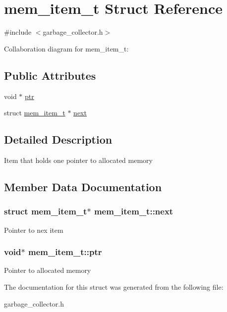 \hypertarget{structmem__item__t}{}\section{mem\+\_\+item\+\_\+t Struct Reference}
\label{structmem__item__t}


{\ttfamily \#include $<$garbage\+\_\+collector.\+h$>$}



Collaboration diagram for mem\+\_\+item\+\_\+t\+:
\subsection*{Public Attributes}
\begin{DoxyCompactItemize}
\item 
void $\ast$ \hyperlink{structmem__item__t_a772a66e71369367d17ad83f95cb05334}{ptr}
\item 
struct \hyperlink{structmem__item__t}{mem\+\_\+item\+\_\+t} $\ast$ \hyperlink{structmem__item__t_a0c2420432b5b23b9c9c18ff784ae2ae3}{next}
\end{DoxyCompactItemize}


\subsection{Detailed Description}
Item that holds one pointer to allocated memory 

\subsection{Member Data Documentation}
\subsubsection[{\texorpdfstring{next}{next}}]{\setlength{\rightskip}{0pt plus 5cm}struct {\bf mem\+\_\+item\+\_\+t}$\ast$ mem\+\_\+item\+\_\+t\+::next}\hypertarget{structmem__item__t_a0c2420432b5b23b9c9c18ff784ae2ae3}{}\label{structmem__item__t_a0c2420432b5b23b9c9c18ff784ae2ae3}
Pointer to nex item 
\subsubsection[{\texorpdfstring{ptr}{ptr}}]{\setlength{\rightskip}{0pt plus 5cm}void$\ast$ mem\+\_\+item\+\_\+t\+::ptr}\hypertarget{structmem__item__t_a772a66e71369367d17ad83f95cb05334}{}\label{structmem__item__t_a772a66e71369367d17ad83f95cb05334}
Pointer to allocated memory 

The documentation for this struct was generated from the following file\+:\begin{DoxyCompactItemize}
\item 
garbage\+\_\+collector.\+h\end{DoxyCompactItemize}
